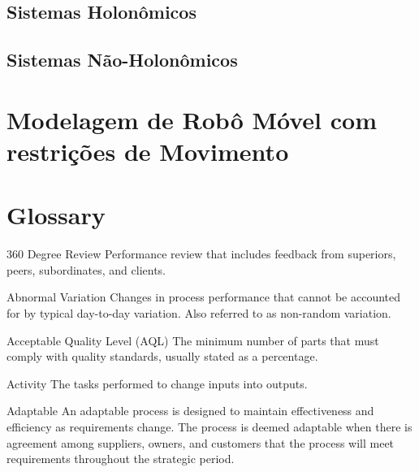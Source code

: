 \subsection{Sistemas Holonômicos}
\subsection{Sistemas Não-Holonômicos}

\section{Modelagem de Robô Móvel com restrições de Movimento}



\section{Glossary}
\begin{Glossary}
\item[360 Degree Review] Performance review that includes feedback from superiors, peers, subordinates, and clients.
\item[Abnormal Variation] Changes in process performance that cannot be accounted for by typical day-to-day variation. Also referred to as
non-random variation.
\item[Acceptable Quality Level (AQL)] The minimum number of parts that must comply with quality standards, usually stated as a percentage.
\item[Activity] The tasks performed to change inputs into outputs.
\item[Adaptable] An adaptable process is designed to maintain effectiveness and efficiency as requirements change. The process is
deemed adaptable when there is agreement among suppliers, owners, and customers that the process will meet
requirements throughout the strategic period.
\end{Glossary}



